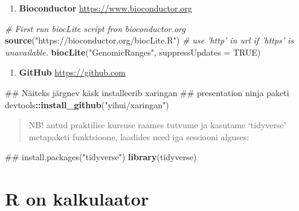 \documentclass[]{book}
\newenvironment{Shaded}{\begin{snugshade}}{\end{snugshade}}
\newcommand{\KeywordTok}[1]{\textcolor[rgb]{0.13,0.29,0.53}{\textbf{#1}}}
\newcommand{\DataTypeTok}[1]{\textcolor[rgb]{0.13,0.29,0.53}{#1}}
\newcommand{\StringTok}[1]{\textcolor[rgb]{0.31,0.60,0.02}{#1}}
\newcommand{\CommentTok}[1]{\textcolor[rgb]{0.56,0.35,0.01}{\textit{#1}}}
\newcommand{\OtherTok}[1]{\textcolor[rgb]{0.56,0.35,0.01}{#1}}
\newcommand{\OperatorTok}[1]{\textcolor[rgb]{0.81,0.36,0.00}{\textbf{#1}}}
\newcommand{\NormalTok}[1]{#1}
\providecommand{\tightlist}{%
  \setlength{\itemsep}{0pt}\setlength{\parskip}{0pt}}
\begin{document}
\begin{enumerate}
\def\labelenumi{\arabic{enumi}.}
\setcounter{enumi}{1}
\tightlist
\item
  \textbf{Bioconductor} \url{https://www.bioconductor.org}
\end{enumerate}

\begin{Shaded}
\begin{Highlighting}[]
\CommentTok{# First run biocLite script fron bioconductor.org}
\KeywordTok{source}\NormalTok{(}\StringTok{"https://bioconductor.org/biocLite.R"}\NormalTok{)  }
\CommentTok{# use 'http' in url if 'https' is unavailable. }
\KeywordTok{biocLite}\NormalTok{(}\StringTok{"GenomicRanges"}\NormalTok{, }\DataTypeTok{suppressUpdates =} \OtherTok{TRUE}\NormalTok{)}
\end{Highlighting}
\end{Shaded}

\begin{enumerate}
\def\labelenumi{\arabic{enumi}.}
\setcounter{enumi}{2}
\tightlist
\item
  \textbf{GitHub} \url{https://github.com}
\end{enumerate}

\begin{Shaded}
\begin{Highlighting}[]
\NormalTok{## Näiteks järgnev käsk installeerib xaringan }
\NormalTok{## presentation ninja paketi}
\NormalTok{devtools}\OperatorTok{::}\KeywordTok{install_github}\NormalTok{(}\StringTok{"yihui/xaringan"}\NormalTok{)}
\end{Highlighting}
\end{Shaded}

\begin{quote}
NB! antud praktilise kursuse raames tutvume ja kasutame `tidyverse'
metapaketi funktsioone, laadides need iga sessiooni alguses:
\end{quote}

\begin{Shaded}
\begin{Highlighting}[]
\NormalTok{## install.packages("tidyverse")}
\KeywordTok{library}\NormalTok{(tidyverse)}
\end{Highlighting}
\end{Shaded}

\chapter{R on kalkulaator}\label{calc}
\end{document}
